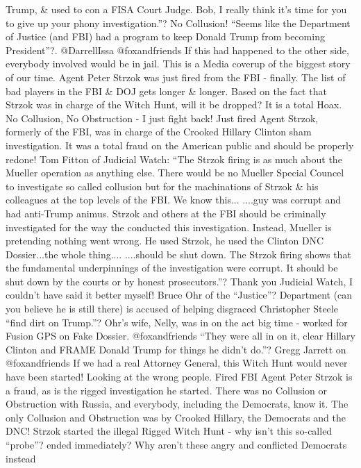 Trump, \& used to con a FISA Court Judge. Bob, I really think it's time
for you to give up your phony investigation.''? No Collusion! ``Seems
like the Department of Justice (and FBI) had a program to keep Donald
Trump from becoming President''?. @DarrellIssa @foxandfriends If this
had happened to the other side, everybody involved would be in jail.
This is a Media coverup of the biggest story of our time. Agent Peter
Strzok was just fired from the FBI - finally. The list of bad players in
the FBI \& DOJ gets longer \& longer. Based on the fact that Strzok was
in charge of the Witch Hunt, will it be dropped? It is a total Hoax. No
Collusion, No Obstruction - I just fight back! Just fired Agent Strzok,
formerly of the FBI, was in charge of the Crooked Hillary Clinton sham
investigation. It was a total fraud on the American public and should be
properly redone! Tom Fitton of Judicial Watch: ``The Strzok firing is as
much about the Mueller operation as anything else. There would be no
Mueller Special Councel to investigate so called collusion but for the
machinations of Strzok \& his colleagues at the top levels of the FBI.
We know this... ....guy was corrupt and had anti-Trump animus. Strzok
and others at the FBI should be criminally investigated for the way the
conducted this investigation. Instead, Mueller is pretending nothing
went wrong. He used Strzok, he used the Clinton DNC Dossier...the whole
thing.... ....should be shut down. The Strzok firing shows that the
fundamental underpinnings of the investigation were corrupt. It should
be shut down by the courts or by honest prosecutors.''? Thank you
Judicial Watch, I couldn't have said it better myself! Bruce Ohr of the
``Justice''? Department (can you believe he is still there) is accused
of helping disgraced Christopher Steele ``find dirt on Trump.''? Ohr's
wife, Nelly, was in on the act big time - worked for Fusion GPS on Fake
Dossier. @foxandfriends ``They were all in on it, clear Hillary Clinton
and FRAME Donald Trump for things he didn't do.''? Gregg Jarrett on
@foxandfriends If we had a real Attorney General, this Witch Hunt would
never have been started! Looking at the wrong people. Fired FBI Agent
Peter Strzok is a fraud, as is the rigged investigation he started.
There was no Collusion or Obstruction with Russia, and everybody,
including the Democrats, know it. The only Collusion and Obstruction was
by Crooked Hillary, the Democrats and the DNC! Strzok started the
illegal Rigged Witch Hunt - why isn't this so-called ``probe''? ended
immediately? Why aren't these angry and conflicted Democrats instead
